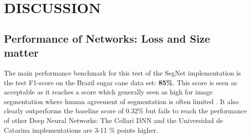 \documentclass{article}
\begin{document}

%

%







%



\section{DISCUSSION}

\subsection{Performance of Networks: Loss and Size matter}
The main performance benchmark for this test of the SegNet implementation is the test F1-score on the Brazil sugar cane data set: \textbf{85\%}.
This score is seen as acceptable as it reaches a score which generally seen as high for image segmentation where human agreement of segmentation is often limited \cite{eval}.  It also clearly outperforms the baseline score of 0.32\% but fails to reach the performance of other Deep Neural Networks: The Cellari DNN and the Universidad de Catarina implementations are 3-11 \% points higher. 
\end{document}
